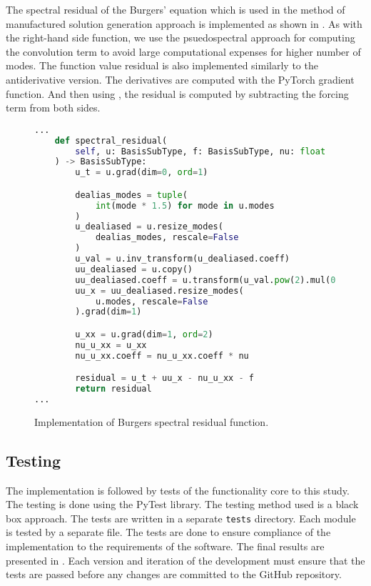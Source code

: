 The spectral residual of the Burgers' equation which is used in the method of manufactured solution generation approach is implemented as shown in . As with the right-hand side function, we use the psuedospectral approach for computing the convolution term to avoid large computational expenses for higher number of modes. The function value residual is also implemented similarly to the antiderivative version. The derivatives are computed with the PyTorch gradient function. And then using , the residual is computed by subtracting the forcing term from both sides.

\begin{figure}[H]
  \centering
  \begin{lstlisting}[language=Python]
...
    def spectral_residual(
        self, u: BasisSubType, f: BasisSubType, nu: float
    ) -> BasisSubType:
        u_t = u.grad(dim=0, ord=1)

        dealias_modes = tuple(
            int(mode * 1.5) for mode in u.modes
        )
        u_dealiased = u.resize_modes(
            dealias_modes, rescale=False
        )
        u_val = u.inv_transform(u_dealiased.coeff)
        uu_dealiased = u.copy()
        uu_dealiased.coeff = u.transform(u_val.pow(2).mul(0.5))
        uu_x = uu_dealiased.resize_modes(
            u.modes, rescale=False
        ).grad(dim=1)

        u_xx = u.grad(dim=1, ord=2)
        nu_u_xx = u_xx
        nu_u_xx.coeff = nu_u_xx.coeff * nu

        residual = u_t + uu_x - nu_u_xx - f
        return residual
...
  \end{lstlisting}
  \caption{Implementation of Burgers spectral residual function.}\label{fig:burgers_spectral_residual_impl}
\end{figure}

\subsection{Testing}
\noindent The implementation is followed by tests of the functionality core to this study. The testing is done using the PyTest library. The testing method used is a black box approach. The tests are written in a separate \verb|tests| directory. Each module is tested by a separate file. The tests are done to ensure compliance of the implementation to the requirements of the software. The final results are presented in . Each version and iteration of the development must ensure that the tests are passed before any changes are committed to the GitHub repository.

